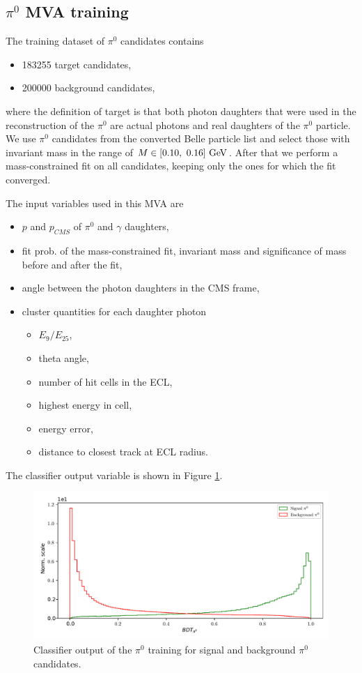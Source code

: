 \subsection{$\pi^0$ MVA training}

The training dataset of $\pi^0$ candidates contains
\begin{itemize}
\item 183255 target candidates,
\item 200000 background candidates,
\end{itemize}
where the definition of target is that both photon daughters that were used in the reconstruction of the $\pi^0$ are actual photons and real daughters of the $\pi^0$ particle. We use $\pi^0$ candidates from the converted Belle particle list and select those with invariant mass in the range of $M \in [0.10,~0.16]\mathrm{~GeV}$. After that we perform a mass-constrained fit on all candidates, keeping only the ones for which the fit converged. 

The input variables used in this MVA are
\begin{itemize}
\item $p$ and $p_{CMS}$ of $\pi^0$ and $\gamma$ daughters,
\item fit prob. of the mass-constrained fit, invariant mass and significance of mass before and after the fit,
\item angle between the photon daughters in the CMS frame,
\item cluster quantities for each daughter photon
	\begin{itemize}
	\item $E_9/E_{25}$,
	\item theta angle,
	\item number of hit cells in the ECL,
	\item highest energy in cell,
	\item energy error,
	\item distance to closest track at ECL radius.
	\end{itemize}
\end{itemize}

The classifier output variable is shown in Figure \ref{fig:ROE_pi0}.

\begin{figure}[H]
\centering
\captionsetup{width=0.8\linewidth}
\includegraphics[width=\linewidth]{fig/ROECleanup_pi0}
\caption{Classifier output of the $\pi^0$ training for signal and background $\pi^0$ candidates.}
\label{fig:ROE_pi0}
\end{figure}

